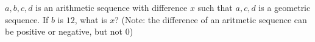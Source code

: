 $a, b, c, d$ is an arithmetic sequence with difference $x$ such that $a, c, d$ is a geometric sequence. If $b$ is $12$, what is $x$? (Note: the difference of an aritmetic sequence can be positive or negative, but not $0$)
